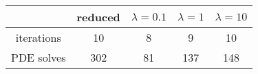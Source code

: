 \begin{tabular}{ccccc}
& reduced & $\lambda = 0.1$ & $\lambda = 1$ & $\lambda = 10$ \\
\hline
iterations & 10 & 8 & 9 & 10 \\
PDE solves & 302 & 81 & 137 & 148 \\
\hline
\end{tabular}
